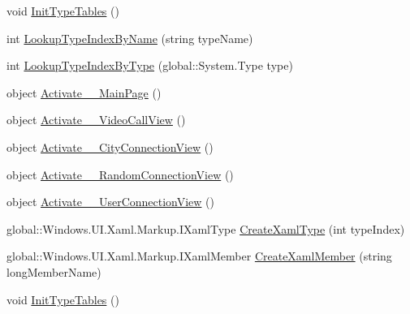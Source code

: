 \begin{DoxyCompactItemize}
\item 
void \hyperlink{class_e_l_i_client_1_1_e_l_i_client___xaml_type_info_1_1_xaml_type_info_provider_a551110be263c526eade19b83971c73ca}{Init\+Type\+Tables} ()
\item 
int \hyperlink{class_e_l_i_client_1_1_e_l_i_client___xaml_type_info_1_1_xaml_type_info_provider_a3009bbb11c7cd77c0b2150ce8b2f1e83}{Lookup\+Type\+Index\+By\+Name} (string type\+Name)
\item 
int \hyperlink{class_e_l_i_client_1_1_e_l_i_client___xaml_type_info_1_1_xaml_type_info_provider_aef061eccf423d6179a7445e6a886268a}{Lookup\+Type\+Index\+By\+Type} (global\+::\+System.\+Type type)
\item 
object \hyperlink{class_e_l_i_client_1_1_e_l_i_client___xaml_type_info_1_1_xaml_type_info_provider_a4f5ed7fa109803ca4e77895515eb3c86}{Activate\+\_\+\_\+\+Main\+Page} ()
\item 
object \hyperlink{class_e_l_i_client_1_1_e_l_i_client___xaml_type_info_1_1_xaml_type_info_provider_a12923c75d1e077e681c27f80787699e6}{Activate\+\_\+\_\+\+Video\+Call\+View} ()
\item 
object \hyperlink{class_e_l_i_client_1_1_e_l_i_client___xaml_type_info_1_1_xaml_type_info_provider_a594a49912d4b1f94fbafdfecd8bcbdb7}{Activate\+\_\+\_\+\+City\+Connection\+View} ()
\item 
object \hyperlink{class_e_l_i_client_1_1_e_l_i_client___xaml_type_info_1_1_xaml_type_info_provider_a9dbfe6cbda6a19d2f569449928dd45bc}{Activate\+\_\+\_\+\+Random\+Connection\+View} ()
\item 
object \hyperlink{class_e_l_i_client_1_1_e_l_i_client___xaml_type_info_1_1_xaml_type_info_provider_a1df3c01fa00c7a6f4ace46ca59e699ab}{Activate\+\_\+\_\+\+User\+Connection\+View} ()
\item 
global\+::\+Windows.\+U\+I.\+Xaml.\+Markup.\+I\+Xaml\+Type \hyperlink{class_e_l_i_client_1_1_e_l_i_client___xaml_type_info_1_1_xaml_type_info_provider_afb9c01c2dd724369db4dcbbf42424ec0}{Create\+Xaml\+Type} (int type\+Index)
\item 
global\+::\+Windows.\+U\+I.\+Xaml.\+Markup.\+I\+Xaml\+Member \hyperlink{class_e_l_i_client_1_1_e_l_i_client___xaml_type_info_1_1_xaml_type_info_provider_abf3f2757986c5f7240025456fa57b28a}{Create\+Xaml\+Member} (string long\+Member\+Name)
\item 
void \hyperlink{class_e_l_i_client_1_1_e_l_i_client___xaml_type_info_1_1_xaml_type_info_provider_a551110be263c526eade19b83971c73ca}{Init\+Type\+Tables} ()
\item 

\end{DoxyCompactItemize}

